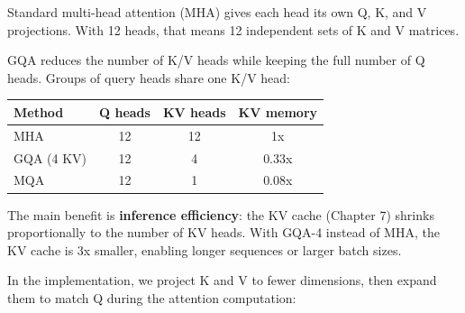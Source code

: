 Standard multi-head attention (MHA) gives each head its own Q, K, and V projections.  With 12 heads, that means 12 independent sets of K and V matrices.

GQA reduces the number of K/V heads while keeping the full number of Q heads.  Groups of query heads share one K/V head:

\begin{center}
\begin{tabular}{lccc}
\toprule
Method & Q heads & KV heads & KV memory \\
\midrule
MHA & 12 & 12 & 1x \\
GQA (4 KV) & 12 & 4 & 0.33x \\
MQA & 12 & 1 & 0.08x \\
\bottomrule
\end{tabular}
\end{center}

The main benefit is \textbf{inference efficiency}: the KV cache (Chapter 7) shrinks proportionally to the number of KV heads.  With GQA-4 instead of MHA, the KV cache is 3x smaller, enabling longer sequences or larger batch sizes.

In the implementation, we project K and V to fewer dimensions, then expand them to match Q during the attention computation:

